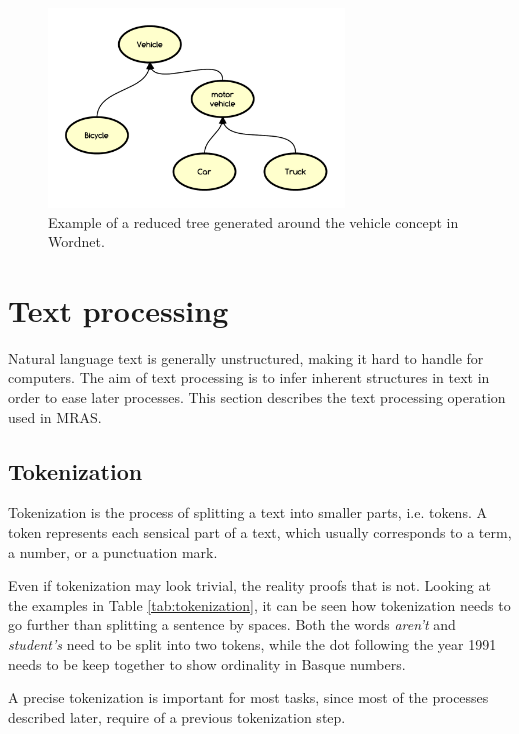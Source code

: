 \documentclass{bsu-ms}
\newcommand{\projectName}{MRAS\xspace}
\begin{document}
\begin{figure}[h!]
\centering
\includegraphics[width=0.7\textwidth]{wordnet}
\caption{Example of a reduced tree generated around the vehicle concept in Wordnet.}
\label{fig:wordnet}
\end{figure}






\section{Text processing}
\label{sec:textprocessing}
Natural language text is generally unstructured, making it hard to handle for computers. The aim of text processing is to infer inherent structures in text in order to ease later processes. This section describes the text processing operation used in \projectName .



\subsection{Tokenization}
Tokenization is the process of splitting a text into smaller parts, i.e. tokens. A token represents each sensical part of a text, which usually corresponds to a term, a number, or a punctuation mark. 

Even if tokenization may look trivial, the reality proofs that is not. Looking at the examples in Table \ref{tab:tokenization}, it can be seen how tokenization needs to go further than splitting a sentence by spaces. Both the words  \emph{aren't} and \emph{student's} need to be split into two tokens, while the dot following the year 1991 needs to be keep together to show ordinality in Basque numbers. 

A precise tokenization is important for most tasks, since most of the processes described later, require of a previous tokenization step. 
\end{document}
